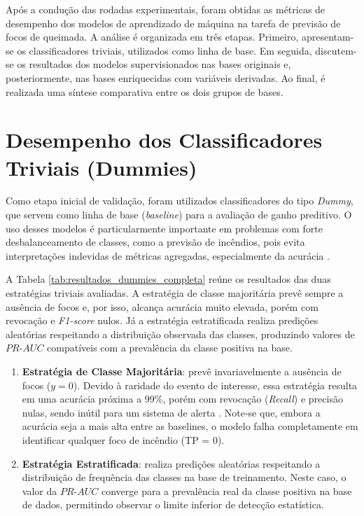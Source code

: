 Após a condução das rodadas experimentais, foram obtidas as métricas de desempenho dos modelos de aprendizado de máquina na tarefa de previsão de focos de queimada. A análise é organizada em três etapas. Primeiro, apresentam-se os classificadores triviais, utilizados como linha de base. Em seguida, discutem-se os resultados dos modelos supervisionados nas bases originais e, posteriormente, nas bases enriquecidas com variáveis derivadas. Ao final, é realizada uma síntese comparativa entre os dois grupos de bases.

\section{Desempenho dos Classificadores Triviais (Dummies)}

Como etapa inicial de validação, foram utilizados classificadores do tipo \textit{Dummy}, que servem como linha de base (\textit{baseline}) para a avaliação de ganho preditivo. O uso desses modelos é particularmente importante em problemas com forte desbalanceamento de classes, como a previsão de incêndios, pois evita interpretações indevidas de métricas agregadas, especialmente da acurácia \cite{saito2015prc}.

A Tabela \ref{tab:resultados_dummies_completa} reúne os resultados das duas estratégias triviais avaliadas. A estratégia de classe majoritária prevê sempre a ausência de focos e, por isso, alcança acurácia muito elevada, porém com revocação e \textit{F1-score} nulos. Já a estratégia estratificada realiza predições aleatórias respeitando a distribuição observada das classes, produzindo valores de $PR\text{-}AUC$ compatíveis com a prevalência da classe positiva na base.
\begin{enumerate}
    \item \textbf{Estratégia de Classe Majoritária}: prevê invariavelmente a ausência de focos ($y=0$). Devido à raridade do evento de interesse, essa estratégia resulta em uma acurácia próxima a 99\%, porém com revocação (\textit{Recall}) e precisão nulas, sendo inútil para um sistema de alerta \cite{andrianarivony2024review}. Note-se que, embora a acurácia seja a mais alta entre as baselines, o modelo falha completamente em identificar qualquer foco de incêndio (TP = 0).
    \item \textbf{Estratégia Estratificada}: realiza predições aleatórias respeitando a distribuição de frequência das classes na base de treinamento. Neste caso, o valor da $PR\text{-}AUC$ converge para a prevalência real da classe positiva na base de dados, permitindo observar o limite inferior de detecção estatística.
\end{enumerate}

